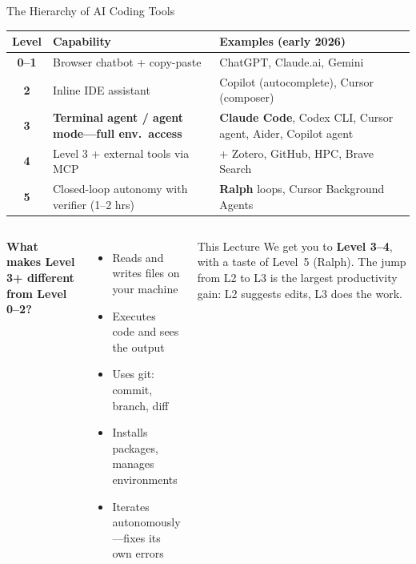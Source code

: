 \documentclass[aspectratio=169,10pt]{beamer}
\newcommand{\emphc}[1]{\textcolor{harvardcrimson}{#1}}
\begin{document}
\begin{frame}{The Hierarchy of AI Coding Tools}
\scriptsize

\begin{center}
\renewcommand{\arraystretch}{1.1}
\begin{tabular}{c p{6.0cm} p{4.7cm}}
\toprule
\textbf{Level} & \textbf{Capability} & \textbf{Examples (early 2026)} \\
\midrule
\textbf{0--1} & Browser chatbot + copy-paste & ChatGPT, Claude.ai, Gemini \\
\textbf{2} & Inline IDE assistant & Copilot (autocomplete), Cursor (composer) \\
\rowcolor{softblue!10}
\textbf{3} & \textbf{Terminal agent / agent mode---full env.\ access} & \textbf{Claude Code}, Codex CLI, Cursor agent, Aider, Copilot agent \\
\rowcolor{softblue!10}
\textbf{4} & Level 3 + external tools via MCP & + Zotero, GitHub, HPC, Brave Search \\
\textbf{5} & Closed-loop autonomy with verifier (1--2 hrs) & \textbf{Ralph} loops, Cursor Background Agents \\
\bottomrule
\end{tabular}
\end{center}

\vspace{0.3em}
\begin{columns}[T]
\textbf{What makes Level 3+ different from Level 0--2?}
\begin{itemize}\itemsep0pt
    \item Reads and writes files on your machine
    \item Executes code and sees the output
    \item Uses git: commit, branch, diff
    \item Installs packages, manages environments
    \item Iterates autonomously---fixes its own errors
\end{itemize}

\begin{alertblock}{This Lecture}
\scriptsize
We get you to \textbf{Level 3--4}, with a taste of Level~5 (Ralph). The jump
from L2 to L3 is the largest productivity gain: L2 suggests edits, L3
\emphc{does the work}.
\end{alertblock}
\end{columns}
\end{frame}
\end{document}
